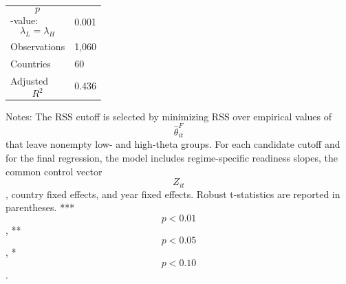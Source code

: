 \begin{table}[H]
\begin{threeparttable}
\begin{tabularx}{\textwidth}{lY}
$$p$$-value: $$\lambda_L=\lambda_H$$ & 0.001 \\
Observations & 1,060 \\
Countries & 60 \\
Adjusted $$R^2$$ & 0.436 \\
\bottomrule
\end{tabularx}
\begin{tablenotes}[flushleft]\footnotesize
\item Notes: The RSS cutoff is selected by minimizing RSS over empirical values of $$\widehat{\theta}^{F}_{it}$$ that leave nonempty low- and high-theta groups. For each candidate cutoff and for the final regression, the model includes regime-specific readiness slopes, the common control vector $$Z_{it}$$, country fixed effects, and year fixed effects. Robust t-statistics are reported in parentheses. *** $$p<0.01$$, ** $$p<0.05$$, * $$p<0.10$$.
\end{tablenotes}
\end{threeparttable}
\end{table}
